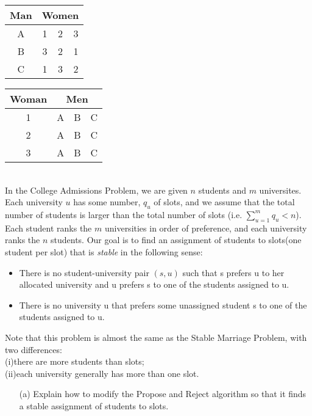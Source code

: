 \documentclass[11pt]{article}
\begin{document}
\begin{qunlist}
\begin{itemize}
\begin{center}
\begin{tabular}{|c|ccc|}\hline 
Man&\multicolumn{3}{|c|}{Women}\\\hline 
A&1&2&3\\\hline 
B&3&2&1\\\hline 
C&1&3&2\\\hline
\end{tabular} 
\hspace{2cm}
\begin{tabular}{|c|ccc|}\hline 
Woman&\multicolumn{3}{|c|}{Men}\\\hline 
1&A&B&C\\\hline 
2&A&B&C\\\hline 
3&A&B&C\\\hline
\end{tabular}
\end{center}

\end{itemize}


\\
In the College Admissions Problem, we are given $n$ students and $m$ universites. Each university $u$ has some number, $q_u$ of slots, and we assume that the total number of students is larger than the total number of slots
(i.e. $\sum_{u=1}^m{q_u} < n$). Each student ranks the $m$ universities in order of preference, and each university ranks the $n$ students. Our goal is to find an assignment of students to slots(one student per slot) that is
\textit{stable} in the following sense:
\begin{itemize}
\item There is no student-university pair $(s,u)$ such that s prefers u to her allocated university and u prefers s to one of the students assigned to u.
\item There is no university u that prefers some unassigned student s to one of the students assigned to u.
\end{itemize}

Note that this problem is almost the same as the Stable Marriage Problem, with two differences: \\
(i)there are more students than slots; \\
(ii)each university generally has more than one slot.

\begin{itemize}
\item[(a)] Explain how to modify the Propose and Reject algorithm so that it finds a stable assignment of students to slots.


\end{itemize}
\end{qunlist}
\end{document}
